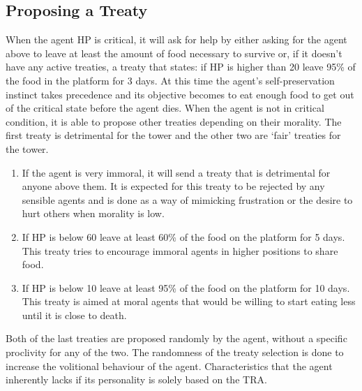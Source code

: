 \subsection{Proposing a Treaty}
When the agent HP is critical, it will ask for help by either asking for the agent above to leave at least the amount of food necessary to survive or, if it doesn’t have any active treaties, a treaty that states: if HP is higher than 20 leave 95\% of the food in the platform for 3 days. At this time the agent's self-preservation instinct takes precedence and its objective becomes to eat enough food to get out of the critical state before the agent dies.
When the agent is not in critical condition, it is able to propose other treaties depending on their morality. The first treaty is detrimental for the tower and the other two are ‘fair’ treaties for the tower. \par
\begin{enumerate}
    \item If the agent is very immoral, it will send a treaty that is detrimental for anyone above them. It is expected for this treaty to be rejected by any sensible agents and is done as a way of mimicking frustration or the desire to hurt others when morality is low.
    \item If HP is below 60 leave at least 60\% of the food on the platform for 5 days. This treaty tries to encourage immoral agents in higher positions to share food. 
    \item If HP is below 10 leave at least 95\% of the food on the platform for 10 days. This treaty is aimed at moral agents that would be willing to start eating less until it is close to death.
\end{enumerate}
Both of the last treaties are proposed randomly by the agent, without a specific proclivity for any of the two. The randomness of the treaty selection is done to increase the volitional behaviour of the agent. Characteristics that the agent inherently lacks if its personality is solely based on the TRA.

